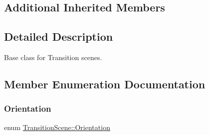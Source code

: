 \subsection*{Additional Inherited Members}


\subsection{Detailed Description}
Base class for Transition scenes. 

\subsection{Member Enumeration Documentation}
\mbox{\label{classTransitionScene_a0b2b247806fb10a20de0cbc554210c4d}} 
\subsubsection{\texorpdfstring{Orientation}{Orientation}\hspace{0.1cm}{\footnotesize\ttfamily [1/2]}}
{\footnotesize\ttfamily enum \hyperlink{classTransitionScene_a0b2b247806fb10a20de0cbc554210c4d}{Transition\+Scene\+::\+Orientation}\hspace{0.3cm}{\ttfamily [strong]}}

